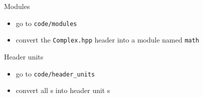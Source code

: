 \begin{frame}[fragile]
  \begin{exercise}{Modules}
    \begin{itemize}
      \item go to \texttt{code/modules}
      \item convert the \texttt{Complex.hpp} header into a module named \texttt{math}
    \end{itemize}
  \end{exercise}
  \begin{exercise}{Header units}
    \begin{itemize}
      \item go to \texttt{code/header\_units}
      \item convert all s into header unit s
    \end{itemize}
  \end{exercise}
\end{frame}
